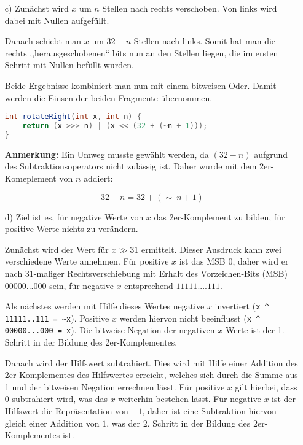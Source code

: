 \documentclass[a4paper,10pt]{scrartcl}
\begin{document}
\begin{enumerate}
\begin{enumerate}
                \begin{lstlisting}[language=java]

                \end{lstlisting}

            \item[c)]
                Zunächst wird $x$ um $n$ Stellen nach rechts verschoben. Von links wird dabei mit Nullen aufgefüllt.

                Danach schiebt man $x$ um $32 - n$ Stellen nach links. Somit hat man die rechts ,,herausgeschobenen`` bits
                nun an den Stellen liegen, die im ersten Schritt mit Nullen befüllt wurden.

                Beide Ergebnisse kombiniert man nun mit einem bitweisen Oder. Damit werden die Einsen der beiden
                Fragmente übernommen.

                \begin{lstlisting}[language=java]
int rotateRight(int x, int n) {
    return (x >>> n) | (x << (32 + (~n + 1)));
}
                \end{lstlisting}

                \textbf{Anmerkung:} Ein Umweg musste gewählt werden, da $(32 - n)$ aufgrund des Subtraktionsoperators
                nicht zulässig ist. Daher wurde mit dem 2er-Komeplement von $n$ addiert:

                $$32 - n = 32 + (\sim\ n + 1)$$

            \item[d)]
                Ziel ist es, für negative Werte von $x$ das 2er-Komplement zu bilden, für positive Werte nichts zu verändern.

                Zunächst wird der Wert für $x \gg 31$ ermittelt. Dieser Ausdruck kann zwei verschiedene
                Werte annehmen. Für positive $x$ ist das MSB $0$, daher wird er nach 31-maliger Rechtsverschiebung
                mit Erhalt des Vorzeichen-Bits (MSB) $00000...000$ sein, für negative $x$ entsprechend $11111....111$.

                Als nächstes werden mit Hilfe dieses Wertes negative $x$ invertiert (\lstinline|x ^ 11111..111 = ~x|). Positive
                $x$ werden hiervon nicht beeinflusst (\lstinline|x ^ 00000...000 = x|). Die bitweise Negation der negativen $x$-Werte
                ist der 1. Schritt in der Bildung des 2er-Komplementes.

                Danach wird der Hilfswert subtrahiert. Dies wird mit Hilfe einer Addition des 2er-Komplementes des
                Hilfswertes erreicht, welches sich durch die Summe aus 1 und der bitweisen Negation errechnen lässt.
                Für positive $x$ gilt hierbei, dass $0$ subtrahiert wird, was das $x$ weiterhin bestehen lässt. Für
                negative $x$ ist der Hilfswert die Repräsentation von $-1$, daher ist eine Subtraktion hiervon gleich
                einer Addition von $1$, was der 2. Schritt in der Bildung des 2er-Komplementes ist.


\end{enumerate}
\end{enumerate}
\end{document}
